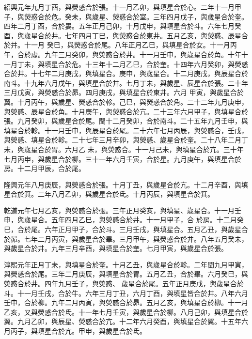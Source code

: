 \begin{pinyinscope}
 紹興元年九月丁酉，與熒惑合於張。十一月乙卯，與填星合於心。二年十一月甲子，與熒惑合於危。癸未，與歲星、熒惑合於室。三年四月戊子，與歲星合於奎。四年二月丁酉，合於婁。五年正月己卯，十月戊申，與填星合於斗。六年七月癸酉，與歲星合於井。七年四月丁巳，與熒惑合於東井。五月乙亥，與熒惑、辰星合於井。十一月
 癸巳，與熒惑合於尾。八年正月乙巳，與填星合於女。十一月丙午，合於虛。九年三月癸卯，與熒惑合於井。十一月壬申，與歲星合於角。十年十一月丁未，與填星合於危。十三年十二月乙巳，合於奎。十四年六月癸卯，與熒惑合於井。十七年二月庚戌，與填星合。庚申，與歲星合。十二月庚戌，與辰星合於南斗。十九年六月戊午，與填星合於井。七月丁未，與歲星、辰星合於張。二十年三月戊寅，與熒惑合於昴。四月庚戌，與填星合於東井。六月
 甲寅，與歲星合於翼。十月丙午，與歲星、熒惑合於軫。己巳，與熒惑合於角。二十二年九月庚申，與熒惑、辰星合於角。十月庚午，與熒惑合於亢。二十三年六月甲子，與填星合於張。九月癸卯，與歲星合於尾。閏十二月癸卯，合於南斗。二十五年九月壬申，與填星合於軫。十一月壬申，與辰星合於尾。二十六年七月丙辰，與熒惑合，壬戌，與熒惑、填星合於軫。二十七年三月辛卯，與熒惑、歲星合於奎。二十八年二月丁未，與歲星合於胃。六月乙
 未，與熒惑合。十一月己未，與填星合於亢。三十年七月丙申，與歲星合於柳。三十一年六月壬寅，合於星。九月庚午，與填星合於房。十二月甲辰，合於尾。



 隆興元年八月庚辰，與熒惑合於張。十月丁丑，與歲星合於亢。十二月辛酉，與填星合於箕。二年八月乙卯，與歲星合於氐。十月丙辰，與填星合於箕。



 乾道元年七月乙亥，與熒惑合於張。三年正月癸亥，與填星、歲星合。十一月壬申，與歲星合。五年四月乙巳，與熒惑合於井。十一月甲子，合
 於房。十二月癸巳，合於尾。六年正月甲子，合於斗。三月壬戌，與填星合。五月乙丑，與歲星合於昴。七年二月丙寅，與歲星合於畢。三月甲午，與熒惑合於井。八年五月癸未，與歲星合於井。九年三月辛酉，與填星合於奎。七月甲寅，與歲星合於張。



 淳熙元年正月丁未，與填星合於奎。十月乙丑，與歲星合於軫。二年閏九月甲寅，與熒惑合於尾。三年二月庚辰，與填星合於胃。五月乙丑，合於畢。六月癸巳，與熒惑合於井。四年九月壬子，與熒惑、
 歲星合於尾。五年正月庚戌，與歲星合於斗。十一月壬戌，合於牛。六年三月丁丑，六月丁酉，與填星皆合於井。八年六月壬申，合於柳。九年二月丙寅，與熒惑合於昴。五月乙亥，與填星合於柳。十一月乙亥，又與熒惑合於氐。十一年七月壬寅，與歲星合於柳。八月己卯，與填星合於翼。九月乙卯，與辰星、熒惑合於亢。十二年六月癸酉，與填星合於翼。十五年六月丙子，與填星合於亢。甲申，與歲星合於氐。




\end{pinyinscope}
